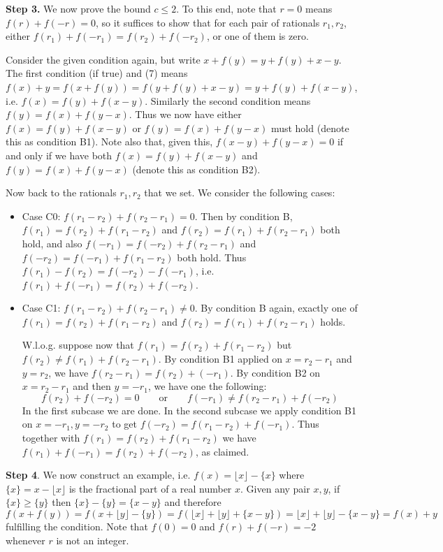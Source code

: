 \documentclass[11pt,a4paper]{article}
\begin{document}
\begin{enumerate}
		\textbf{Step 3.} We now prove the bound $c\le 2$. To this end, note that $r = 0$ means $f(r) + f(-r)= 0$, so it suffices to show that for each pair of rationals $r_1, r_2$, either $f(r_1) + f(-r_1) = f(r_2) + f(-r_2)$, or one of them is zero.
		
		Consider the given condition again, but write $x + f(y) = y + f(y) + x - y$. The first condition (if true) and (7) means $f(x)+y = f(x+f(y)) = f(y+f(y)+x-y) = y + f(y) + f(x - y)$, i.e. $f(x) = f(y) + f(x - y)$. Similarly the second condition means $f(y) = f(x) + f(y - x)$. Thus we now have either $f(x) = f(y) + f(x - y)$ or $f(y) = f(x) + f(y - x)$ must hold (denote this as condition B1). Note also that, given this, $f(x-y)+f(y-x)=0$ if and only if we have both $f(x) = f(y) + f(x - y)$ and $f(y) = f(x) + f(y - x)$ (denote this as condition B2).
		
		Now back to the rationals $r_1, r_2$ that we set. We consider the following cases:
		\begin{itemize}
			\item 
			Case C0: $f(r_1-r_2)+f(r_2-r_1)=0$. Then by condition B, $f(r_1) = f(r_2) + f(r_1 - r_2)$ and $f(r_2) = f(r_1) + f(r_2 - r_1)$ both hold, and also $f(-r_1) = f(-r_2) + f(r_2 - r_1)$ and $f(-r_2) = f(-r_1) + f(r_1 - r_2)$ both hold. Thus $f(r_1)-f(r_2) = f(-r_2)-f(-r_1)$, i.e. $f(r_1)+f(-r_1)=f(r_2)+f(-r_2)$.
			
			\item 
			Case C1: $f(r_1-r_2)+f(r_2-r_1)\neq 0$. By condition B again, exactly one of $f(r_1) = f(r_2) + f(r_1 - r_2)$ and $f(r_2) = f(r_1) + f(r_2 - r_1)$ holds.
			
			W.l.o.g. suppose now that $f(r_1) = f(r_2) + f(r_1 - r_2)$ but $f(r_2) \neq f(r_1) + f(r_2 - r_1)$. By condition B1 applied on $x = r_2-r_1$ and $y = r_2$,
			we have $f(r_2-r_1) = f(r_2) + (-r_1)$. By condition B2 on $x = r_2-r_1$ and then $y = -r_1$, we have one the following:
			\[f(r_2)+f(-r_2)=0\qquad \text{or}\qquad f(-r_1) \neq f(r_2-r_1)+f(-r_2) \]In the first subcase we are done. In the second subcase we apply condition B1 on $x=-r_1, y=-r_2$ to get
			$f(-r_2)=f(r_1-r_2) + f(-r_1)$.
			Thus together with $f(r_1) = f(r_2) + f(r_1 - r_2)$ we have $f(r_1)+f(-r_1)=f(r_2)+f(-r_2)$, as claimed.
		\end{itemize}
		
		\textbf{Step 4}. We now construct an example, 
		i.e. $f(x) = \lfloor x\rfloor - \{x\}$ 
		where $\{x\} = x - \lfloor x\rfloor$ is the fractional part of a real number $x$. 
		Given any pair $x, y$, 
		if $\{x\}\ge \{y\}$ then $\{x\} - \{y\}=\{x-y\}$ and therefore 
		\[
		f(x + f(y))
		=f(x + \lfloor y\rfloor - \{y\})
		=f(\lfloor x\rfloor + \lfloor y\rfloor
		+ \{x-y\})
		=\lfloor x\rfloor + \lfloor y\rfloor-\{x-y\}
		=f(x)+y
		\]
		fulfilling the condition. 
		Note that $f(0)=0$ and $f(r)+f(-r)=-2$ whenever $r$ is not an integer. 
		

\end{enumerate}
\end{document}
